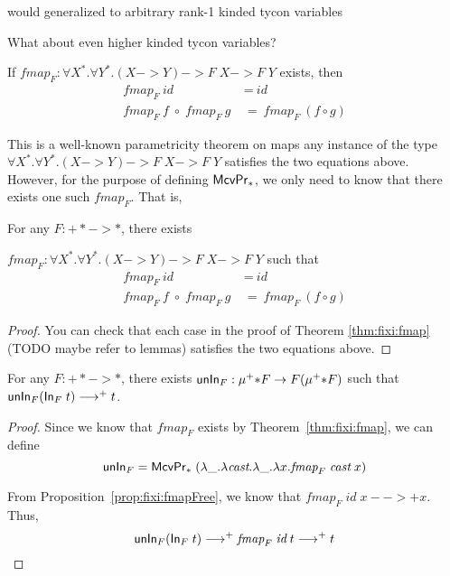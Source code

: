 would generalized to arbitrary rank-1 kinded tycon variables


What about even higher kinded tycon variables?


\begin{proposition}\label{prop:fixi:fmapFree}
If $\textit{fmap}_F:\forall X^{*}.\forall Y^{*}.(X -> Y) -> F\;X -> F\;Y$
exists, then
\begin{align*}
\textit{fmap}_F~\textit{id} &~=~ \textit{id} \\
\textit{fmap}_F~\textit{f} \;\circ\; \textit{fmap}_F~\textit{g}
&~=~ \textit{fmap}_F~(f\circ g)
\end{align*}
\end{proposition}\noindent
This is a well-known parametricity theorem on maps any instance of the type
$\forall X^{*}.\forall Y^{*}.(X -> Y) -> F\;X -> F\;Y$ satisfies
the two equations above. However, for the purpose of defining $\mathsf{McvPr}_{*}$,
we only need to know that there exists one such $\textit{fmap}_F$. That is,
\begin{proposition}\label{prop:fixi:fmapHom}
For any $F : +* -> *$, there exists

$\textit{fmap}_F:\forall X^{*}.\forall Y^{*}.(X -> Y) -> F\;X -> F\;Y$
such that
\begin{align*}
\textit{fmap}_F~\textit{id} &~=~ \textit{id} \\
\textit{fmap}_F~\textit{f} \;\circ\; \textit{fmap}_F~\textit{g}
&~=~ \textit{fmap}_F~(f\circ g)
\end{align*}
\end{proposition}
\begin{proof}
        You can check that each case
        in the proof of Theorem \ref{thm:fixi:fmap} (TODO maybe refer to lemmas)
        satisfies the two equations above.
\end{proof}

\begin{proposition} For any $F : +* -> *$, there exists
$\mathsf{unIn}_F : \mu^{+}{*} F -> F(\mu^{+}{*} F)$ such that
$\mathsf{unIn}_F (\mathsf{In}_F\;t) -->+ t$.
\end{proposition}
\begin{proof}
Since we know that $\textit{fmap}_F$ exists by Theorem~\ref{thm:fixi:fmap},
we can define
\[ \mathsf{unIn}_F = \mathsf{McvPr}_{*}\;
            (\lambda\_.\lambda\textit{cast}.\lambda\_.\lambda x.\textit{fmap}_F\;\textit{cast}\;x)
\]

From Proposition~\ref{prop:fixi:fmapFree}, we know that
$\textit{fmap}_F\;\textit{id}\;x -->+ x$.
Thus,
\[ \mathsf{unIn}_F (\mathsf{In}_F\;t) -->+ \textit{fmap}_F\;\textit{id}\;t -->+ t \]
\end{proof}


